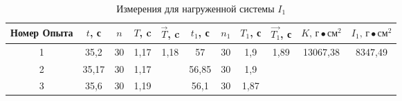 \begin{table}[ht]
    \centering
    
    \begin{tabular}{|c|c|c|c|c|c|c|c|c|c|c|}
        \hline
        Номер Опыта & $t$, с & $n$ & $T$, c &     $\vec{T}$, c      & $t_1$, с & $n_1$ & $T_1$, с & $\vec{T_1}$, с         & $K \text{, г}\bullet\text{см}^2$ & $I_1\text{, г}\bullet\text{см}^2$ \\
        \hline
                  1 &  35,2  & 30  &  1,17  & \multirow{3}{*}{1,18} &   57     &  30   &  1,9     & \multirow{3}{*}{1,89}  &     \multirow{3}{*}{13067,38 }   & \multirow{3}{*}{8347,49}          \\
        \hline
                  2 &  35,17 & 30  &  1,17  &                       &   56,85  &  30   &  1,9     &                        &                                  &                                   \\
        \hline
                  3 &  35,6  & 30  &  1,19  &                       &   56,1   &  30   &  1,87    &                        &                                  &                                   \\
        \hline
    \end{tabular}

    \caption{Измерения для нагруженной системы $I_1$} \label{table-2}
\end{table}